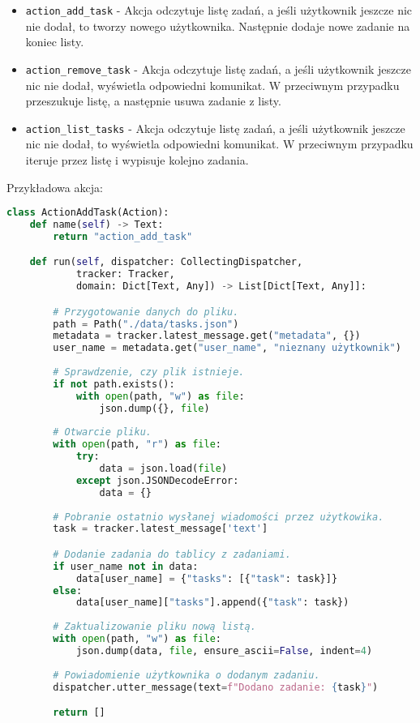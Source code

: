\documentclass{article}
\begin{document}
\begin{itemize}
    \item[\textcolor{violet}{\textbullet}] \verb|action_add_task| - Akcja odczytuje listę zadań, a jeśli
        użytkownik jeszcze nic nie dodał, to tworzy nowego użytkownika.
        Następnie dodaje nowe zadanie na koniec listy.
    \item[\textcolor{violet}{\textbullet}] \verb|action_remove_task| - Akcja odczytuje listę zadań, a jeśli
        użytkownik jeszcze nic nie dodał, wyświetla odpowiedni komunikat.
        W przeciwnym przypadku przeszukuje listę, a następnie usuwa zadanie
        z listy.
    \item[\textcolor{violet}{\textbullet}] \verb|action_list_tasks| - Akcja odczytuje listę zadań, a jeśli
        użytkownik jeszcze nic nie dodał, to wyświetla odpowiedni komunikat.
        W przeciwnym przypadku iteruje przez listę i wypisuje kolejno zadania.
\end{itemize}
Przykładowa akcja:
\begin{lstlisting}[language=Python, caption=Akcja dodawania]
class ActionAddTask(Action):
    def name(self) -> Text:
        return "action_add_task"

    def run(self, dispatcher: CollectingDispatcher,
            tracker: Tracker,
            domain: Dict[Text, Any]) -> List[Dict[Text, Any]]:

        # Przygotowanie danych do pliku.
        path = Path("./data/tasks.json")
        metadata = tracker.latest_message.get("metadata", {})
        user_name = metadata.get("user_name", "nieznany użytkownik")
    
        # Sprawdzenie, czy plik istnieje.
        if not path.exists():
            with open(path, "w") as file:
                json.dump({}, file)
        
        # Otwarcie pliku.
        with open(path, "r") as file:
            try:
                data = json.load(file)
            except json.JSONDecodeError:
                data = {}
        
        # Pobranie ostatnio wysłanej wiadomości przez użytkowika.
        task = tracker.latest_message['text']

        # Dodanie zadania do tablicy z zadaniami.
        if user_name not in data:
            data[user_name] = {"tasks": [{"task": task}]}
        else:
            data[user_name]["tasks"].append({"task": task})
        
        # Zaktualizowanie pliku nową listą.
        with open(path, "w") as file:
            json.dump(data, file, ensure_ascii=False, indent=4)
        
        # Powiadomienie użytkownika o dodanym zadaniu.
        dispatcher.utter_message(text=f"Dodano zadanie: {task}")

        return []
\end{lstlisting}
\end{document}
